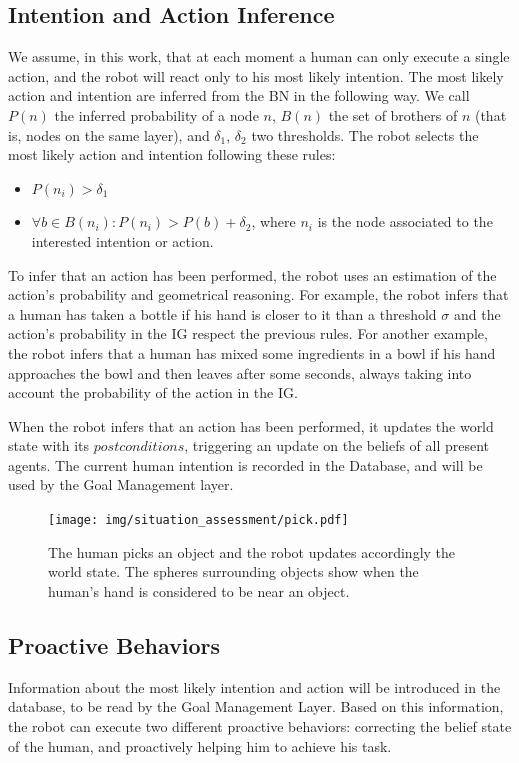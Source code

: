 \subsection{Intention and Action Inference}
\label{sec:situation_assessment-intention and action inference}
We assume, in this work, that at each moment a human can only execute a single action, and the robot will react only to his most likely intention. The most likely action and intention are inferred from the BN in the following way. We call $P(n)$ the inferred probability of a node $n$, $B(n)$ the set of brothers of $n$ (that is, nodes on the same layer), and $\delta_1$, $\delta_2$ two thresholds. The robot selects the most likely action and intention following these rules: 
\begin{itemize}
\item  \(P(n_i)>\delta_1\) 
\item  \(\forall b \in B(n_i): P(n_i)>P(b)+\delta_2\), where $n_i$ is the node associated to the interested intention or action.
\end{itemize}


To infer that an action has been performed, the robot uses an estimation of the action's probability and geometrical reasoning. For example, the robot infers that a human has taken a bottle if his hand is closer to it than a threshold $\sigma$  and the action's probability in the IG respect the previous rules. For another example, the robot infers that a human has mixed some ingredients in a bowl if his hand approaches the bowl and then leaves after some seconds, always taking into account the probability of the action in the IG.

When the robot infers that an action has been performed, it updates the world state with its $postconditions$, triggering an update on the beliefs of all present agents. The current human intention is recorded in the Database, and will be used by the Goal Management layer.

 \begin{figure}[ht!]
	\centering
	\texttt{[image: img/situation\_assessment/pick.pdf]}
	\caption[Actions and world update]{The human picks an object and the robot updates accordingly the world state. The spheres surrounding objects show when the human's hand is considered to be near an object.}
	\label{fig:situation_assessment-pick}
\end{figure}


\subsection{Proactive Behaviors}
\label{subsec:situation_assessment-proactive_behaviors}
Information about the most likely intention and action will be introduced in the database, to be read by the Goal Management Layer. Based on this information, the robot can execute two different proactive behaviors: correcting the belief state of the human, and proactively helping him to achieve his task.

